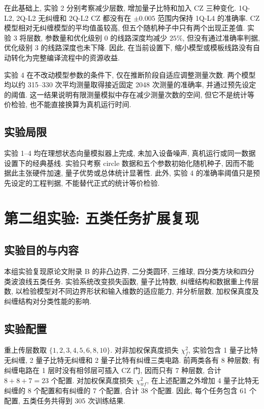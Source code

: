 \documentclass[a4paper]{ctexart}
\begin{document}
在此基础上, 实验 2 分别考察减少层数, 增加量子比特和加入 CZ 三种变化. 1Q-L2, 2Q-L2 无纠缠和 2Q-L2 CZ 都没有在 $\pm0.005$ 范围内保持 1Q-L4 的准确率. CZ 模型相对无纠缠模型的平均值虽较高, 但五个随机种子中只有两个出现正差值. 实验 3 将层数, 参数量和优化级别 0 的线路深度均减少 $25\%$, 但没有通过准确率判据, 优化级别 3 的线路深度也未下降. 因此, 在当前设置下, 缩小模型或模板线路没有自动转化为完整编译流程中的资源收益.

实验 4 在不改动模型参数的条件下, 仅在推断阶段自适应调整测量次数. 两个模型均以约 315--330 次平均测量取得接近固定 2048 次测量的准确率, 并通过预先设定的阈值. 这一结果说明有限测量模拟中存在减少测量次数的空间, 但它不是统计等价检验, 也不能直接换算为真机运行时间.

\subsection{实验局限}

实验 1--4 均在理想状态向量模拟器上完成, 未加入设备噪声, 真机运行或同一数据设置下的经典基线. 实验只考察 circle 数据和五个参数初始化随机种子, 因而不能据此主张硬件加速, 量子优势或总体统计显著性. 此外, 实验 4 的准确率阈值只是预先设定的工程判据, 不能替代正式的统计等价检验.

\section{第二组实验: 五类任务扩展复现}

\subsection{实验目的与内容}

本组实验复现原论文附录 B 的非凸边界, 二分类圆环, 三维球, 四分类方块和四分类波浪线五类任务. 实验系统改变损失函数, 量子比特数, 纠缠结构和数据重上传层数, 以检验模型对不同边界形状和输入维数的适应能力, 并分析层数, 加权保真度及纠缠结构对分类性能的影响.

\subsection{实验配置}

重上传层数取 $\{1,2,3,4,5,6,8,10\}$. 对非加权保真度损失 $\chi_f^2$, 实验包含 1 量子比特无纠缠, 2 量子比特无纠缠和 2 量子比特有纠缠三类电路. 前两类各有 8 种层数; 有纠缠电路在 1 层时没有相邻层可插入 CZ 门, 因而只有 7 种层数, 合计 $8+8+7=23$ 个配置. 对加权保真度损失 $\chi_{wf}^2$, 在上述配置之外增加 4 量子比特无纠缠的 8 个配置和有纠缠的 7 个配置, 合计 38 个配置. 因此, 每个任务包含 61 个配置, 五类任务共得到 305 次训练结果.
\end{document}
